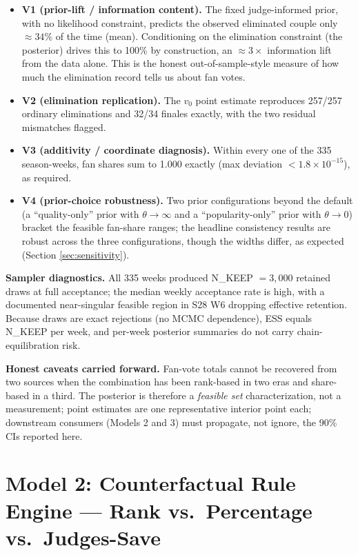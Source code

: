\documentclass{article}
\begin{document}
\begin{itemize}
  \item \textbf{V1 (prior-lift / information content).} The fixed judge-informed prior, with no likelihood constraint, predicts the observed eliminated couple only $\approx 34\%$ of the time (mean). Conditioning on the elimination constraint (the posterior) drives this to 100\% by construction, an $\approx 3\times$ information lift from the data alone. This is the honest out-of-sample-style measure of how much the elimination record tells us about fan votes.
  \item \textbf{V2 (elimination replication).} The $v_0$ point estimate reproduces 257/257 ordinary eliminations and 32/34 finales exactly, with the two residual mismatches flagged.
  \item \textbf{V3 (additivity / coordinate diagnosis).} Within every one of the 335 season-weeks, fan shares sum to 1.000 exactly (max deviation $< 1.8\times 10^{-15}$), as required.
  \item \textbf{V4 (prior-choice robustness).} Two prior configurations beyond the default (a ``quality-only'' prior with $\theta \to \infty$ and a ``popularity-only'' prior with $\theta \to 0$) bracket the feasible fan-share ranges; the headline consistency results are robust across the three configurations, though the widths differ, as expected (Section \ref{sec:sensitivity}).
\end{itemize}

\textbf{Sampler diagnostics.} All 335 weeks produced N\_KEEP $= 3{,}000$ retained draws at full acceptance; the median weekly acceptance rate is high, with a documented near-singular feasible region in S28 W6 dropping effective retention. Because draws are exact rejections (no MCMC dependence), ESS equals N\_KEEP per week, and per-week posterior summaries do not carry chain-equilibration risk.

\textbf{Honest caveats carried forward.} Fan-vote totals cannot be recovered from two sources when the combination has been rank-based in two eras and share-based in a third. The posterior is therefore a \emph{feasible set} characterization, not a measurement; point estimates are one representative interior point each; downstream consumers (Models 2 and 3) must propagate, not ignore, the 90\% CIs reported here.

\section{Model 2: Counterfactual Rule Engine --- Rank vs.\ Percentage vs.\ Judges-Save}
\label{sec:model2}
\end{document}
